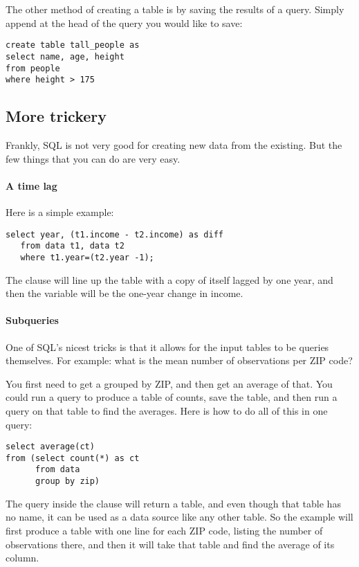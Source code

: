 The other method of creating a table is by saving the results of a
query. Simply append  at the head of the
query you would like to save: 
\begin{lstlisting}
create table tall_people as
select name, age, height 
from people
where height > 175
\end{lstlisting}



\subsection{More trickery} Frankly, SQL is not very good for
creating new data from the existing. But the few things that you can do
are very easy.

\paragraph{A time lag} Here is a simple example:
\begin{lstlisting}
select year, (t1.income - t2.income) as diff
   from data t1, data t2
   where t1.year=(t2.year -1);
\end{lstlisting}


The  clause will line up the table with a copy of itself
lagged by one year, and then the  variable will be the
one-year change in income.


\paragraph{Subqueries} 
One of SQL's nicest tricks is that it allows for the input tables to be
queries themselves. For example: what is the mean number of observations per
ZIP code?

You first need to get a  grouped by ZIP, and then get an
average of that. You could run a query to produce a table of counts,
save the table, and then run a query on that table to find the averages.
Here is how to do all of this in one query: 
\begin{lstlisting}
select average(ct) 
from (select count(*) as ct
      from data
      group by zip)
\end{lstlisting}
The query inside the  clause will return a table, and even
though that table has no name, it can be used as a data source like any other
table. So the example will first produce a table with one line for each
ZIP code, listing the number of observations there, and then it will
take that table and find the average of its  column.

